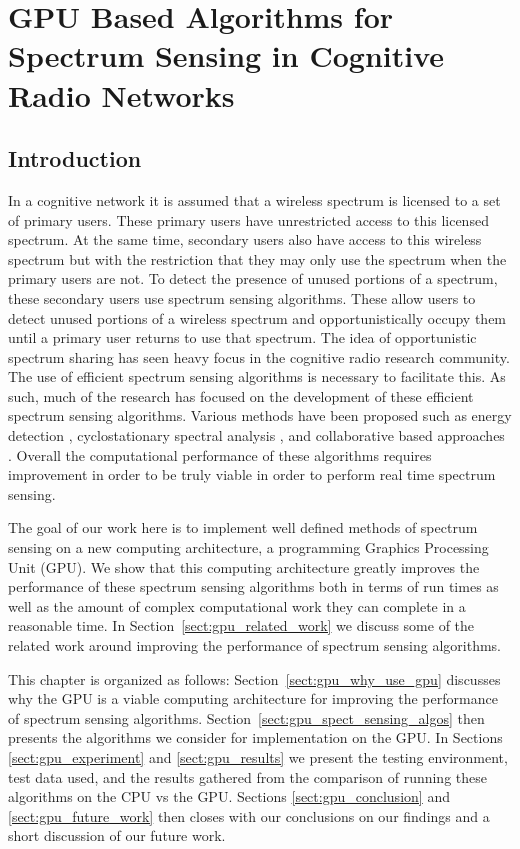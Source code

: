 \chapter{GPU Based Algorithms for Spectrum Sensing in Cognitive Radio Networks}
\label{chap:cognet_gpu}
\section{Introduction}
In a cognitive network it is assumed that a wireless spectrum is licensed to a set of primary users.  These primary users have unrestricted access to this licensed spectrum.  At the same time, secondary users also have access to this wireless spectrum but with the restriction that they may only use the spectrum when the primary users are not.  To detect the presence of unused portions of a spectrum, these secondary users use spectrum sensing algorithms.  These allow users to detect unused portions of a wireless spectrum and opportunistically occupy them until a primary user returns to use that spectrum.  The idea of opportunistic spectrum sharing has seen heavy focus in the cognitive radio research community.  The use of efficient spectrum sensing algorithms is necessary to facilitate this.  As such, much of the research has focused on the development of these efficient spectrum sensing algorithms.  Various methods have been proposed such as energy detection \cite{CabTkaBro06}\cite{HurParWoo06}, cyclostationary spectral analysis \cite{FenBos07}\cite{OshClaEbe07}, and collaborative based approaches \cite{GanLi05}\cite{SadAzm08}.  Overall the computational performance of these algorithms requires improvement in order to be truly viable in order to perform real time spectrum sensing.

The goal of our work here is to implement well defined methods of spectrum sensing on a new computing architecture, a programming Graphics Processing Unit (GPU).  We show that this computing architecture greatly improves the performance of these spectrum sensing algorithms both in terms of run times as well as the amount of complex computational work they can complete in a reasonable time.  In Section~\ref{sect:gpu_related_work} we discuss some of the related work around improving the performance of spectrum sensing algorithms.  

This chapter is organized as follows: Section~\ref{sect:gpu_why_use_gpu} discusses why the GPU is a viable computing architecture for improving the performance of spectrum sensing algorithms.  Section~\ref{sect:gpu_spect_sensing_algos} then presents the algorithms we consider for implementation on the GPU.  In Sections \ref{sect:gpu_experiment} and \ref{sect:gpu_results} we present the testing environment, test data used, and the results gathered from the comparison of running these algorithms on the CPU vs the GPU.  Sections \ref{sect:gpu_conclusion} and \ref{sect:gpu_future_work} then closes with our conclusions on our findings and a short discussion of our future work.

